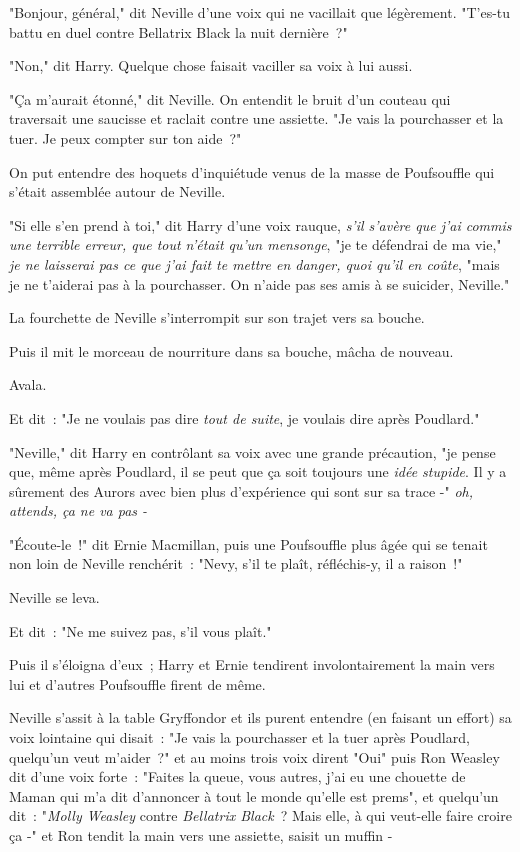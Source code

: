 "Bonjour, général," dit Neville d'une voix qui ne vacillait que légèrement. "T'es-tu battu en duel contre Bellatrix Black la nuit dernière~?"

"Non," dit Harry. Quelque chose faisait vaciller sa voix à lui aussi.

"Ça m'aurait étonné," dit Neville. On entendit le bruit d'un couteau qui traversait une saucisse et raclait contre une assiette. "Je vais la pourchasser et la tuer. Je peux compter sur ton aide~?"

On put entendre des hoquets d'inquiétude venus de la masse de Poufsouffle qui s'était assemblée autour de Neville.

"Si elle s'en prend à toi," dit Harry d'une voix rauque, \emph{s'il s'avère que j'ai commis une terrible erreur, que tout n'était qu'un mensonge}, "je te défendrai de ma vie," \emph{je ne laisserai pas ce que j'ai fait te mettre en danger, quoi qu'il en coûte}, "mais je ne t'aiderai pas à la pourchasser. On n'aide pas ses amis à se suicider, Neville."

La fourchette de Neville s'interrompit sur son trajet vers sa bouche.

Puis il mit le morceau de nourriture dans sa bouche, mâcha de nouveau.

Avala.

Et dit~: "Je ne voulais pas dire \emph{tout de suite}, je voulais dire après Poudlard."

"Neville," dit Harry en contrôlant sa voix avec une grande précaution, "je pense que, même après Poudlard, il se peut que ça soit toujours une \emph{idée stupide}. Il y a sûrement des Aurors avec bien plus d'expérience qui sont sur sa trace -" \emph{oh, attends, ça ne va pas -}

"Écoute-le~!" dit Ernie Macmillan, puis une Poufsouffle plus âgée qui se tenait non loin de Neville renchérit~: "Nevy, s'il te plaît, réfléchis-y, il a raison~!"

Neville se leva.

Et dit~: "Ne me suivez pas, s'il vous plaît."

Puis il s'éloigna d'eux~; Harry et Ernie tendirent involontairement la main vers lui et d'autres Poufsouffle firent de même.

Neville s'assit à la table Gryffondor et ils purent entendre (en faisant un effort) sa voix lointaine qui disait~: "Je vais la pourchasser et la tuer après Poudlard, quelqu'un veut m'aider~?" et au moins trois voix dirent "Oui" puis Ron Weasley dit d'une voix forte~: "Faites la queue, vous autres, j'ai eu une chouette de Maman qui m'a dit d'annoncer à tout le monde qu'elle est prems", et quelqu'un dit~: "\emph{Molly Weasley} contre \emph{Bellatrix Black}~? Mais elle, à qui veut-elle faire croire ça -" et Ron tendit la main vers une assiette, saisit un muffin -

